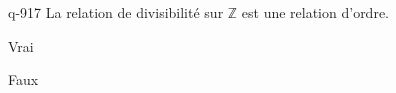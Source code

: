\begin{truefalse}{q-917}
La relation de divisibilité sur $\mathbb Z$ est une relation d'ordre.
\item Vrai
\item* Faux
\end{truefalse}

